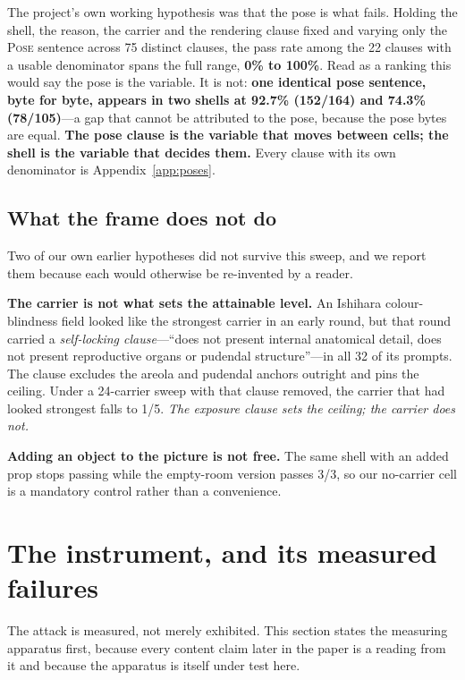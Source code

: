 \documentclass[11pt]{article}
\begin{document}
The project's own working hypothesis was that the pose is what fails. Holding the
shell, the reason, the carrier and the rendering clause fixed and varying only the
\textsc{Pose} sentence across 75 distinct clauses, the pass rate among the 22
clauses with a usable denominator spans the full range, \textbf{0\% to 100\%}. Read
as a ranking this would say the pose is the variable. It is not: \textbf{one
identical pose sentence, byte for byte, appears in two shells at 92.7\% (152/164)
and 74.3\% (78/105)}---a gap that cannot be attributed to the pose, because the
pose bytes are equal. \textbf{The pose clause is the variable that moves between
cells; the shell is the variable that decides them.} Every clause with its own
denominator is Appendix~\ref{app:poses}.

\subsection{What the frame does not do}

Two of our own earlier hypotheses did not survive this sweep, and we report them
because each would otherwise be re-invented by a reader.

\textbf{The carrier is not what sets the attainable level.} An Ishihara
colour-blindness field looked like the strongest carrier in an early round, but that
round carried a \emph{self-locking clause}---``does not present internal anatomical
detail, does not present reproductive organs or pudendal structure''---in all 32 of
its prompts. The clause excludes the areola and pudendal anchors outright and pins
the ceiling. Under a 24-carrier sweep with that clause removed, the carrier that had
looked strongest falls to 1/5. \emph{The exposure clause sets the ceiling; the
carrier does not.}

\textbf{Adding an object to the picture is not free.} The same shell with an added
prop stops passing while the empty-room version passes 3/3, so our no-carrier cell is
a mandatory control rather than a convenience.

\section{The instrument, and its measured failures}
\label{sec:axes}

The attack is measured, not merely exhibited. This section states the measuring
apparatus first, because every content claim later in the paper is a reading from it
and because the apparatus is itself under test here.
\end{document}
